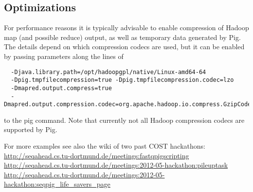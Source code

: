 \subsection{Optimizations}

For performance reasons it is typically advisable to enable compression of
Hadoop map (and possible reduce) output, as well as temporary data generated
by Pig. The details depend on which compression codecs are used, but it can
be enabled by passing parameters along the lines of
\begin{lstlisting}
  -Djava.library.path=/opt/hadoopgpl/native/Linux-amd64-64
  -Dpig.tmpfilecompression=true -Dpig.tmpfilecompression.codec=lzo
  -Dmapred.output.compress=true
  -Dmapred.output.compression.codec=org.apache.hadoop.io.compress.GzipCodec
\end{lstlisting}

 to the pig command. Note that currently not all Hadoop compression codecs are
 supported by Pig.

For more examples see also the wiki of two past COST hackathons:\\
\url{http://seqahead.cs.tu-dortmund.de/meetings:fastqpigscripting}\\
\url{http://seqahead.cs.tu-dortmund.de/meetings:2012-05-hackathon:pileuptask}\\
\url{http://seqahead.cs.tu-dortmund.de/meetings:2012-05-hackathon:seqpig_life_savers_page}

